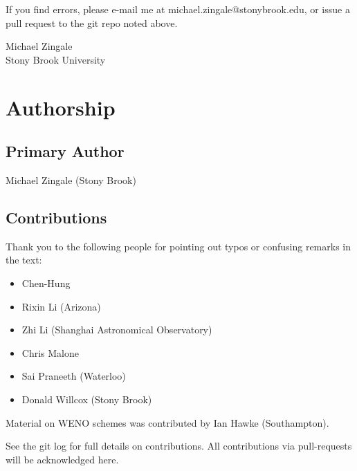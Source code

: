 If you find errors, please e-mail me at michael.zingale@stonybrook.edu,
or issue a pull request to the git repo noted above.



\begin{flushright}
Michael Zingale \\
Stony Brook University
\end{flushright}

\clearpage



\clearpage

\section*{Authorship}

\subsection*{Primary Author}

Michael Zingale (Stony Brook)


\subsection*{Contributions}

Thank you to the
following people for pointing out typos or confusing remarks in the text:
\begin{itemize}
\item Chen-Hung
\item Rixin Li (Arizona)
\item Zhi Li (Shanghai Astronomical Observatory)
\item Chris Malone
\item Sai Praneeth (Waterloo)
\item Donald Willcox (Stony Brook)
\end{itemize}

Material on WENO schemes was contributed by Ian Hawke (Southampton).

See the git log for full details on contributions.  All contributions
via pull-requests will be acknowledged here.
